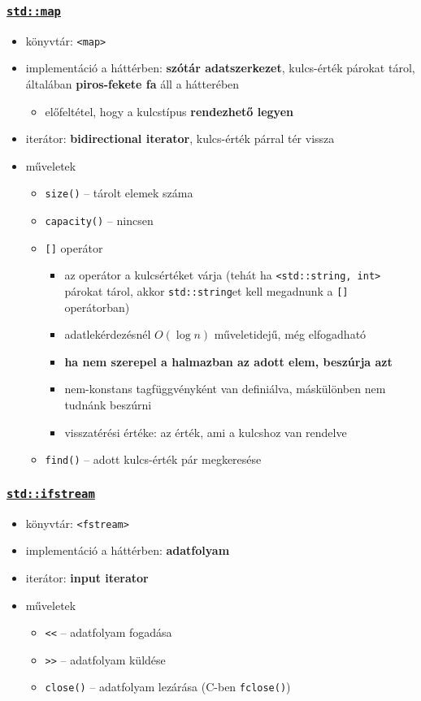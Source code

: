 \documentclass[a4paper, 11pt, oneside]{book}
\begin{document}
\subsubsection{\underline{\texttt{std::map}}}

\begin{itemize}
	\item könyvtár: \verb*|<map>|
	\item implementáció a háttérben: \textbf{szótár adatszerkezet}, kulcs-érték párokat tárol, általában \textbf{piros-fekete fa} áll a hátterében
	\begin{itemize}
		\item előfeltétel, hogy a kulcstípus \textbf{rendezhető legyen}
	\end{itemize}
	\item iterátor: \textbf{bidirectional iterator}, kulcs-érték párral tér vissza
	\item műveletek
	\begin{itemize}
		\item \texttt{size()} -- tárolt elemek száma
		\item \texttt{capacity()} -- nincsen
		\item \texttt{[]} operátor
		\begin{itemize}
			\item az operátor a kulcsértéket várja (tehát ha \verb*|<std::string, int>| párokat tárol, akkor \verb*|std::string|et kell megadnunk a \verb*|[]| operátorban)
			\item adatlekérdezésnél $O(\log n)$ műveletidejű, még elfogadható
			\item \textbf{ha nem szerepel a halmazban az adott elem, beszúrja azt}
			\item nem-konstans tagfüggvényként van definiálva, máskülönben nem tudnánk beszúrni
			\item visszatérési értéke: az érték, ami a kulcshoz van rendelve
		\end{itemize}
		\item \verb*|find()| -- adott kulcs-érték pár megkeresése
	\end{itemize}
\end{itemize}


\subsubsection{\underline{\texttt{std::ifstream}}}

\begin{itemize}
	\item könyvtár: \verb*|<fstream>|
	\item implementáció a háttérben: \textbf{adatfolyam}
	\item iterátor: \textbf{input iterator}
	\item műveletek
	\begin{itemize}
		\item \verb*|<<| -- adatfolyam fogadása
		\item \verb*|>>| -- adatfolyam küldése
		\item \verb*|close()| -- adatfolyam lezárása (C-ben \verb*|fclose()|)
	\end{itemize}
\end{itemize}
\end{document}
